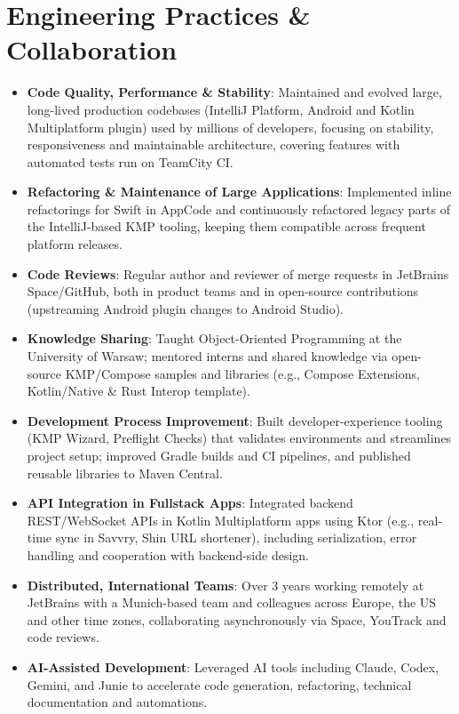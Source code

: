 \documentclass[letterpaper,11pt]{article}
\newcommand{\resumeItem}[2]{
  \item\small{
    \textbf{#1}{: #2 \vspace{-2pt}}
  }
}
\newcommand{\resumeSubItem}[2]{\resumeItem{#1}{#2}\vspace{-4pt}}
\newcommand{\resumeSubHeadingListStart}{\begin{itemize}[leftmargin=*]}
\newcommand{\resumeSubHeadingListEnd}{\end{itemize}}
\begin{document}
  \section{Engineering Practices \& Collaboration}
    \resumeSubHeadingListStart
      \resumeSubItem{Code Quality, Performance \& Stability}
        {Maintained and evolved large, long-lived production codebases (IntelliJ Platform, Android and Kotlin Multiplatform plugin) used by millions of developers, focusing on stability, responsiveness and maintainable architecture, covering features with automated tests run on TeamCity CI.}
      \resumeSubItem{Refactoring \& Maintenance of Large Applications}
        {Implemented inline refactorings for Swift in AppCode and continuously refactored legacy parts of the IntelliJ-based KMP tooling, keeping them compatible across frequent platform releases.}
      \resumeSubItem{Code Reviews}
        {Regular author and reviewer of merge requests in JetBrains Space/GitHub, both in product teams and in open-source contributions (upstreaming Android plugin changes to Android Studio).}
      \resumeSubItem{Knowledge Sharing}
        {Taught Object-Oriented Programming at the University of Warsaw; mentored interns and shared knowledge via open-source KMP/Compose samples and libraries (e.g., Compose Extensions, Kotlin/Native \& Rust Interop template).}
      \resumeSubItem{Development Process Improvement}
        {Built developer-experience tooling (KMP Wizard, Preflight Checks) that validates environments and streamlines project setup; improved Gradle builds and CI pipelines, and published reusable libraries to Maven Central.}
      \resumeSubItem{API Integration in Fullstack Apps}
        {Integrated backend REST/WebSocket APIs in Kotlin Multiplatform apps using Ktor (e.g., real-time sync in Savvry, Shin URL shortener), including serialization, error handling and cooperation with backend-side design.}
      \resumeSubItem{Distributed, International Teams}
        {Over 3 years working remotely at JetBrains with a Munich-based team and colleagues across Europe, the US and other time zones, collaborating asynchronously via Space, YouTrack and code reviews.}
      \resumeSubItem{AI-Assisted Development}
        {Leveraged AI tools including Claude, Codex, Gemini, and Junie to accelerate code generation, refactoring, technical documentation and automations.}
    \resumeSubHeadingListEnd

\end{document}
